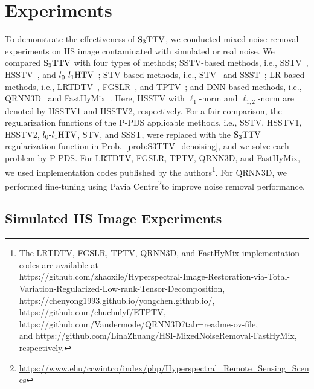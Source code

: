 \section{Experiments}
\label{sec:experiments}

To demonstrate the effectiveness of ${\text{S}_{3} \text{TTV}}$, we conducted mixed noise removal experiments on HS image contaminated with simulated or real noise.
We compared ${\text{S}_{3} \text{TTV}}$ with four types of methods; SSTV-based methods, i.e., SSTV~\cite{Aggarwal2016SSTV}, HSSTV~\cite{Takeyama2020HSSTV}, and ${l_{0}\text{-}l_{1}\text{HTV}}$~\cite{Wang2021l0l1HTV}; STV-based methods, i.e., STV~\cite{Lefkimmiatis2015STV} and SSST~\cite{Kurihara2017SSST}; LR-based methods, i.e., LRTDTV~\cite{Wang2018LRTDTV}, FGSLR~\cite{Chen2022FGSLR}, and TPTV~\cite{Chen2023TPTV}; and DNN-based methods, i.e., QRNN3D~\cite{Wei2021QRNN3D} and FastHyMix~\cite{Zhuang2023FastHyMix}. 
Here, HSSTV with $\ell_{1}$-norm and $\ell_{1,2}$-norm are denoted by HSSTV1 and HSSTV2, respectively.
For a fair comparison, the regularization functions of the P-PDS applicable methods, i.e., SSTV, HSSTV1, HSSTV2, ${l_{0}\text{-}l_{1}\text{HTV}}$, STV, and SSST, were replaced with the ${\text{S}_{3} \text{TTV}}$ regularization function in Prob.~\eqref{prob:S3TTV_denoising}, and we solve each problem by P-PDS.
For LRTDTV, FGSLR, TPTV, QRNN3D, and FastHyMix, we used implementation codes published by the authors\footnote{The LRTDTV, FGSLR, TPTV, QRNN3D, and FastHyMix implementation codes are available at 
\\ https://github.com/zhaoxile/Hyperspectral-Image-Restoration-via-Total-Variation-Regularized-Low-rank-Tensor-Decomposition, \\https://chenyong1993.github.io/yongchen.github.io/, \\https://github.com/chuchulyf/ETPTV, \\https://github.com/Vandermode/QRNN3D?tab=readme-ov-file, \\and https://github.com/LinaZhuang/HSI-MixedNoiseRemoval-FastHyMix, respectively.}. For QRNN3D, we performed fine-tuning using Pavia Centre\footnote{\url{https://www.ehu/ccwintco/index/php/Hyperspectral_Remote_Sensing_Scenes}}to improve noise removal performance.
% 
% 

\subsection{Simulated HS Image Experiments}
%



%
%
%


